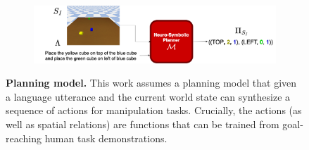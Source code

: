 \label{sec:problem2}

\begin{figure}
    \begin{subfigure}{1.0\hsize}
         \centering    
         \includegraphics[scale=0.25]{figures/nsrm.png}
    \end{subfigure}
    \caption{
            \textbf{Planning model.} 
            This work assumes a planning model that given a language utterance and the current world state can synthesize a sequence of actions for manipulation tasks. Crucially, the actions (as well as spatial relations) are functions that can be trained from goal-reaching human task demonstrations. 
        }
    \label{fig:nsrm}
\end{figure}

